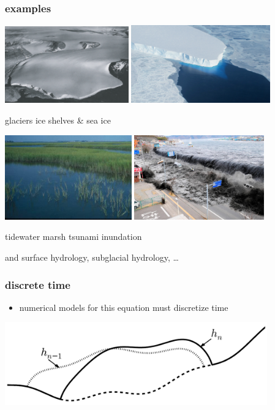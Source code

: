 \documentclass[hide notes,intlimits]{beamer}
\begin{document}
\begin{frame}
  \frametitle{examples}
\includegraphics[width=0.4\textwidth,keepaspectratio=true]{polaris}
\hfill
\includegraphics[width=0.45\textwidth,keepaspectratio=true]{supp4rignot-small}

\small glaciers \hfill ice shelves \& sea ice
\medskip

\includegraphics[width=0.41\textwidth,keepaspectratio=true]{marsh-water}
\hfill
\includegraphics[width=0.42\textwidth,keepaspectratio=true]{tsunami-sendai}

\small tidewater marsh \hfill tsunami inundation

\scriptsize and surface hydrology, subglacial hydrology, \dots
\end{frame}


\begin{frame}
  \frametitle{discrete time}
\begin{itemize}
\item numerical models for this equation must discretize time
\end{itemize}
\begin{center}
\includegraphics[width=0.85\textwidth,keepaspectratio=true]{cartoon-sets-crop}
\end{center}
\end{frame}
\end{document}
